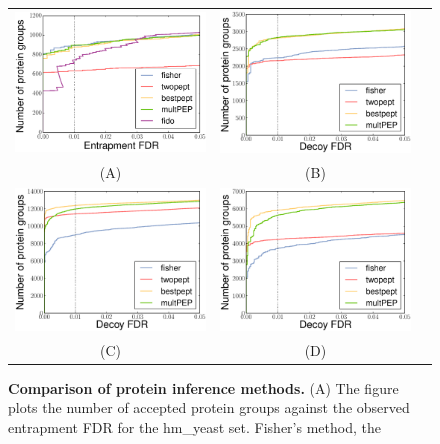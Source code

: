 \documentclass{article}
\begin{document}
\begin{figure}
\centering
\begin{tabular}{ccc}
\includegraphics[width=0.45\linewidth]{
./img/unique-pept-performance-with-fido-exact} &
\includegraphics[width=0.45\linewidth]
{./img/wu-ipi-performance}\\
(A) & (B)\\
\includegraphics[width=0.45\linewidth]
{./img/kim-swissprot-performance} &
\includegraphics[width=0.45\linewidth]
{./img/kim-uniprot-performance}\\
(C) & (D)
\end{tabular}
  \caption{{\bf Comparison of protein inference methods.} (A) The
figure plots the number of accepted protein groups against the 
observed entrapment FDR for the hm\_yeast set. Fisher's method, the 
}
\end{figure}
\end{document}
